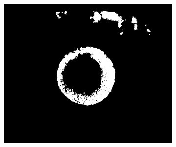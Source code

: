 \documentclass{article}
\begin{document}
\begin{figure}[H]
\begin{subfigure}{.09\textwidth}
  \label{fig:arrow}
\end{subfigure}%
\begin{subfigure}{.47\textwidth}
  \centering
  \includegraphics[width=0.97\linewidth]{_Figures/raw_data_3_opening.png}
  \caption{}
  \label{fig:raw_3_opening}
\end{subfigure}



\end{figure}
\end{document}
